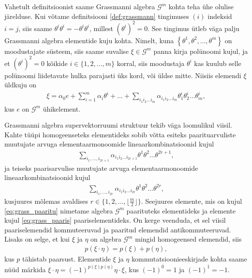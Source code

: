 \documentclass[12pt]{article}
\theoremstyle{plain}
\theoremstyle{definition}
\numberwithin{equation}{section}
\def\G{{\mathcal G}}
\begin{document}
Vahetult definitsioonist saame Grassmanni algebra $\G^m$ kohta 
teha ühe olulise järelduse. Kui võtame definitsiooni 
\ref{def:grassmann} tingimuses $(i)$ indeksid $i = j$, siis saame 
$\theta^i \theta^i = -\theta^i \theta^i$, millest
$\left(\theta^i\right)^2 = 0$. See tingimus ütleb väga palju 
Grassmanni algebra elementide kuju kohta. Nimelt, kuna 
$\left\lbrace\theta^1, \theta^2, \ldots, \theta^m\right\rbrace$ 
on moodustajate süsteem, siis saame suvalise $\xi \in \G^m$ 
panna kirja polünoomi kujul, ja et $\left(\theta^i\right)^2 = 0$ 
kõikide $i \in \{1, 2, \ldots, m\}$ korral, siis moodustaja 
$\theta^i$ kas kuulub selle polünoomi liidetavate hulka parajasti 
üks kord, või üldse mitte. Niisiis elemendi $\xi$ üldkuju on
\begin{align*}
\xi = \alpha_0 e + \sum_{i = 1}^{m} \alpha_i \theta^i + \ldots + 
\sum_{i_1 i_2 \ldots i_m} \alpha_{i_1 i_2 \ldots i_m} 
\theta^i_1 \theta^i_2 \ldots \theta^i_m,
\end{align*}
kus $e$ on $\G^m$ ühikelement.

Grassmanni algebra supervektorruumi struktuur tekib väga loomulikul 
viisil. Kahte tüüpi homogeenseteks elementideks sobib võtta
esiteks paarituarvuliste muutujate arvuga elementaarmonoomide 
lineaarkombinatsioonid kujul
\begin{align} \label{eq:grass_paaritu}
\sum_{i_1, \ldots, i_{2r+1}} \alpha_{i_1 i_2 \ldots i_{2r+1}} 
\theta^1 \theta^2 \ldots \theta^{2r+1},
\end{align}
ja teiseks paarisarvulise muutujate arvuga elementaarmonoomide 
lineaarkombinatsioonid kujul
\begin{align} \label{eq:grass_paaris}
\sum_{i_1, \ldots, i_{2r}} \alpha_{i_1 i_2 \ldots i_{2r}} 
\theta^1 \theta^2 \ldots \theta^{2r},
\end{align}
kusjuures mõlemas avaldises $r \in \{1, 2, \ldots, 
\lfloor \frac{m}{2} \rfloor \}$. Seejuures elemente, mis on kujul 
\ref{eq:grass_paaritu} nimetame algebra $\G^m$ paarituteks 
elementideks ja elemente kujul \ref{eq:grass_paaris} 
paaris\-elementideks. On kerge veenduda, et sel viisil 
paariselemendid kommuteeruvad ja paaritud elemendid 
antikommuteeruvad. Lisaks on selge, et kui $\xi$ ja $\eta$ on 
algebra $\G^m$ mingid homogeensed elemendid, siis 
\begin{align} \label{eq:grass_parity}
p \left(\xi \cdot \eta \right) = p \left(\xi\right) 
+ p \left(\eta \right),
\end{align}
kus $p$ tähistab paarsust. Elementide $\xi$ ja $\eta$ 
kommutatsioonieeskirjade kohta saame nüüd 
märkida $\xi \cdot \eta = \left(-1\right)^{p\left(\xi\right) 
p\left(\eta\right)} \eta \cdot \xi$, kus 
$\left(-1\right)^{\overline{0}} = 1$ ja 
$\left(-1\right)^{\overline{1}} = -1$.
\end{document}
